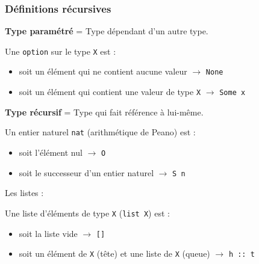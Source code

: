 \documentclass[9pt,handout]{beamer}
\newenvironment{ex}[1][Exemple]{\begin{exampleblock}{#1}}{\end{exampleblock}}
\newcommand{\defi}[1]{\textbf{#1}}
\begin{document}
\begin{frame}
\frametitle{Définitions récursives}

\defi{Type paramétré} = Type dépendant d'un autre type.
\begin{ex}[Une \texttt{option} sur le type \texttt{X} est :]
\begin{itemize}
  \item soit un élément qui ne contient aucune valeur $\rightarrow$ \texttt{None}
  \item soit un élément qui contient une valeur de type \texttt{X} $\rightarrow$ \texttt{Some x}
\end{itemize}
\end{ex}

\pause
\defi{Type récursif} = Type qui fait référence à lui-même.
\begin{ex}[Un entier naturel \texttt{nat} (arithmétique de Peano) est :]
\begin{itemize}
  \item soit l'élément nul $\rightarrow$ \texttt{O}
  \item soit le successeur d'un entier naturel $\rightarrow$ \texttt{S n}
\end{itemize}
\end{ex}

\pause
Les listes :
\begin{ex}[Une liste d'éléments de type \texttt{X} (\texttt{list X}) est :]
\begin{itemize}
  \item soit la liste vide $\rightarrow$ \texttt{[]}
  \item soit un élément de \texttt{X} (tête) et une liste de \texttt{X} (queue) $\rightarrow$ \texttt{h :: t}
\end{itemize}
\end{ex}
\end{frame}
\end{document}
